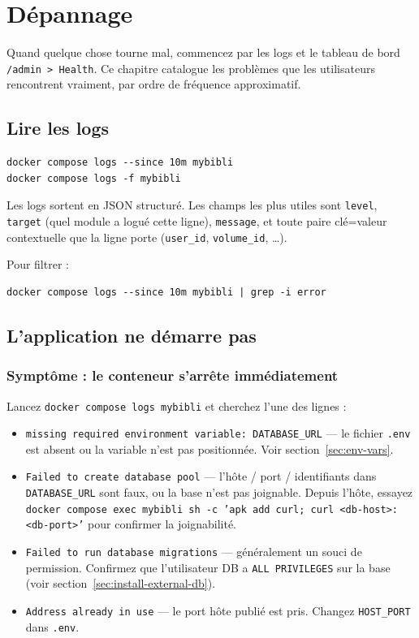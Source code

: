 \chapter{Dépannage}
\label{ch:troubleshooting}

Quand quelque chose tourne mal, commencez par les logs et le tableau
de bord \texttt{/admin > Health}. Ce chapitre catalogue les
problèmes que les utilisateurs rencontrent vraiment, par ordre de
fréquence approximatif.

\section{Lire les logs}

\begin{lstlisting}
docker compose logs --since 10m mybibli
docker compose logs -f mybibli
\end{lstlisting}

Les logs sortent en JSON structuré. Les champs les plus utiles sont
\texttt{level}, \texttt{target} (quel module a logué cette ligne),
\texttt{message}, et toute paire clé=valeur contextuelle que la
ligne porte (\texttt{user\_id}, \texttt{volume\_id}, \dots).

Pour filtrer :

\begin{lstlisting}
docker compose logs --since 10m mybibli | grep -i error
\end{lstlisting}

\section{L'application ne démarre pas}

\subsection*{Symptôme : le conteneur s'arrête immédiatement}

Lancez \texttt{docker compose logs mybibli} et cherchez l'une des
lignes :

\begin{itemize}
  \item \texttt{missing required environment variable:
        DATABASE\_URL} — le fichier
        \texttt{.env} est absent ou la variable n'est pas
        positionnée. Voir section~\ref{sec:env-vars}.
  \item \texttt{Failed to create database pool} — l'hôte / port /
        identifiants dans \texttt{DATABASE\_URL} sont faux, ou la
        base n'est pas joignable. Depuis l'hôte, essayez
        \texttt{docker compose exec mybibli sh -c 'apk add curl;
        curl <db-host>:<db-port>'} pour confirmer la joignabilité.
  \item \texttt{Failed to run database migrations} — généralement
        un souci de permission. Confirmez que l'utilisateur DB a
        \texttt{ALL PRIVILEGES} sur la base (voir
        section~\ref{sec:install-external-db}).
  \item \texttt{Address already in use} — le port hôte publié est
        pris. Changez \texttt{HOST\_PORT} dans \texttt{.env}.
\end{itemize}

